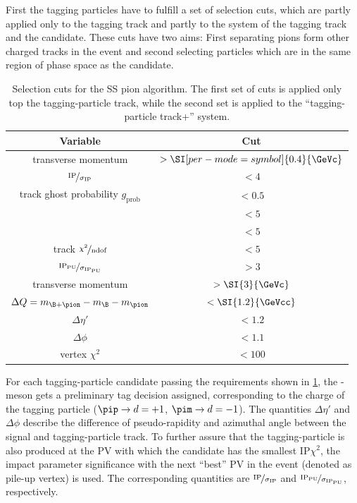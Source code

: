 First the tagging particles have to fulfill a set of selection cuts, which are partly applied only to the tagging track and partly to the system of the tagging track and the \B candidate. These cuts have two aims:
First separating pions form other charged tracks in the event and second selecting particles which are in the same region of phase space as the \B candidate.
\begin{table}[tbp]
	\centering
	\caption{Selection cuts for the SS pion algorithm.
	The first set of cuts is applied only top the tagging-particle track, while the second set is applied to the \enquote{tagging-particle track+\B} system.}
	\begin{tabular}{cc}
		\toprule
		Variable & Cut \\
		\midrule
		transverse momentum \pt 											& $>\SI[per-mode=symbol]{0.4}{\GeVc}$ \\
		$\nicefrac{\text{IP}}{\sigma_{\text{IP}}}$							& $<4$ \\
		track ghost probability $g_{\text{prob}}$ 							& $<0.5$ \\
		\dllppi 															& $<5$ \\
		\dllkpi 															& $<5$ \\
		track $\nicefrac{\chi^2}{\text{ndof}}$ 								& $<5$ \\
		$\nicefrac{\text{IP}_{\text{PU}}}{\sigma_{\text{IP}_{\text{PU}}}}$ 	& $>3$ \\
		\midrule
		transverse momentum \pt 					& $>\SI{3}{\GeVc}$ \\
		$\Delta Q=m_{\B+\pion}-m_{\B}-m_{\pion}$ 	& $<\SI{1.2}{\GeVcc}$ \\
		$\Delta\eta'$								& $<1.2$ \\
		$\Delta\phi$								& $<1.1$ \\
		vertex $\chi^2$ 							& $<100$ \\
		\bottomrule
	\end{tabular}
	\label{tab:SSPionselectionCuts}
\end{table}
For each tagging-particle candidate passing the requirements shown in \cref{tab:SSPionselectionCuts}, the \B-meson gets a preliminary tag decision assigned, corresponding to the charge of the tagging particle (\mbox{$\pip\rightarrow d=+1$}, \mbox{$\pim\rightarrow d=-1$}).
The quantities $\Delta\eta'$ and $\Delta\phi$ describe the difference of pseudo-rapidity and azimuthal angle between the signal and tagging-particle track.
To further assure that the tagging-particle is also produced at the \ac{PV} with which the \B candidate has the smallest $\text{IP}\chi^2$, the impact parameter significance with the next \enquote{best} PV in the event (denoted as pile-up vertex) is used.
The corresponding quantities are $\nicefrac{\text{IP}}{\sigma_{\text{IP}}}$ and $\nicefrac{\text{IP}_{\text{PU}}}{\sigma_{\text{IP}_{\text{PU}}}}$, respectively.

